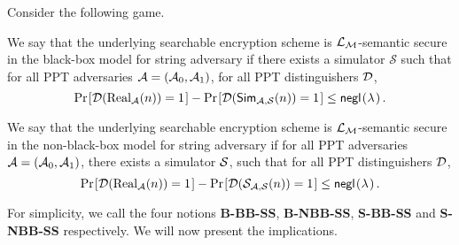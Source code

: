\begin{definition}
	Consider the following game.
	
	\begin{pchstack}[center]
		
		\pchspace
	\end{pchstack}
	
	We say that the underlying searchable encryption scheme is $\mathcal{L}_\mathcal{M}$-semantic secure in the black-box model for string adversary if there exists a simulator $\mathcal{S}$ such that for all PPT adversaries $\mathcal{A} = (\mathcal{A}_0, \mathcal{A}_1)$, for all PPT distinguishers $\mathcal{D}$, 
	\begin{equation}
	\prob{\dister(\text{Real}_\mathcal{A}(n)) = 1} - \prob{\dister(\simulator_\mathcal{A,S}(n)) = 1} \leq \negl.
	\end{equation}
	
	We say that the underlying searchable encryption scheme is $\mathcal{L}_\mathcal{M}$-semantic secure in the non-black-box model for string adversary if for all PPT adversaries $\mathcal{A} = (\mathcal{A}_0, \mathcal{A}_1)$, there exists a simulator $\mathcal{S}$, such that for all PPT distinguishers $\mathcal{D}$, 
	\begin{equation}
	\prob{\dister(\text{Real}_\mathcal{A}(n)) = 1} - \prob{\dister(\simer_\mathcal{A,S}(n)) = 1} \leq \negl.
	\end{equation}
	
\end{definition}

For simplicity, we call the four notions \textbf{B-BB-SS}, \textbf{B-NBB-SS}, \textbf{S-BB-SS} and \textbf{S-NBB-SS} respectively. We will now present the implications.

